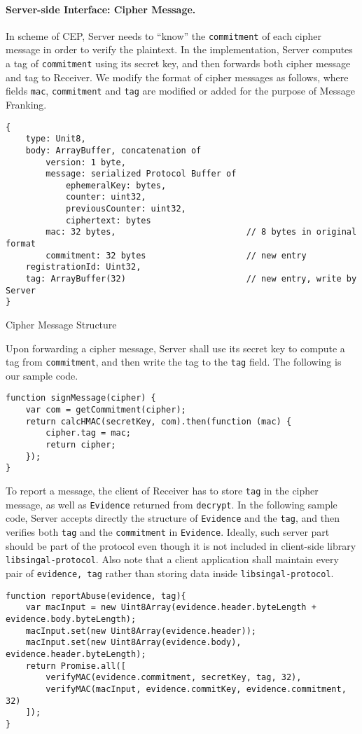 \documentclass{article}
\begin{document}
\paragraph{Server-side Interface: Cipher Message.}
In scheme of CEP, Server needs to ``know'' 
the {\tt commitment} of each cipher message
in order to verify the plaintext.
In the implementation, 
Server computes a tag of {\tt commitment} using its secret key,
and then forwards both cipher message and tag to Receiver.
We modify the format of cipher messages as follows,
where fields {\tt mac}, {\tt commitment} and {\tt tag}
are modified or added for the purpose of Message Franking.
\begin{table}[h]
{\small
\begin{verbatim}
{
    type: Unit8, 
    body: ArrayBuffer, concatenation of
        version: 1 byte,
        message: serialized Protocol Buffer of
            ephemeralKey: bytes,
            counter: uint32, 
            previousCounter: uint32, 
            ciphertext: bytes
        mac: 32 bytes,                          // 8 bytes in original format
        commitment: 32 bytes                    // new entry
    registrationId: Uint32, 
    tag: ArrayBuffer(32)                        // new entry, write by Server
}
\end{verbatim}
}
\caption{Cipher Message Structure}
\label{tbl:cipher-message}
\end{table}
Upon forwarding a cipher message,
Server shall use its secret key to compute a tag from {\tt commitment},
and then write the tag to the {\tt tag} field.
The following is our sample code.
{\small
\begin{verbatim}
function signMessage(cipher) {
    var com = getCommitment(cipher);
    return calcHMAC(secretKey, com).then(function (mac) {
        cipher.tag = mac;
        return cipher;
    });
}
\end{verbatim}
}
To report a message,
the client of Receiver has to store {\tt tag} in the cipher message,
as well as {\tt Evidence} returned from {\tt decrypt}.
In the following sample code, 
Server accepts directly the structure of {\tt Evidence} and the {\tt tag},
and then verifies both {\tt tag} and the {\tt commitment} in {\tt Evidence}.
Ideally, such server part should be part of the protocol
even though it is not included in client-side library {\tt libsingal-protocol}.
Also note that a client application shall maintain every pair of 
{\tt evidence, tag} rather than storing data inside {\tt libsingal-protocol}. 
{\small
\begin{verbatim}
function reportAbuse(evidence, tag){
    var macInput = new Uint8Array(evidence.header.byteLength + evidence.body.byteLength);
    macInput.set(new Uint8Array(evidence.header));
    macInput.set(new Uint8Array(evidence.body), evidence.header.byteLength);
    return Promise.all([
        verifyMAC(evidence.commitment, secretKey, tag, 32),
        verifyMAC(macInput, evidence.commitKey, evidence.commitment, 32)
    ]);
}
\end{verbatim}
}
\end{document}
